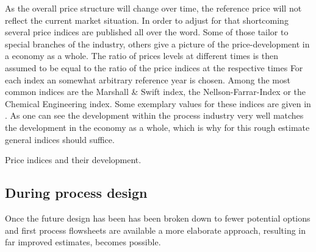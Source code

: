         As the overall price structure will change over time, the reference price will not reflect the current
        market situation. In order to adjust for that shortcoming several price indices are published
        all over the word. Some of those tailor to special branches of the industry, others give a picture
        of the price-development in a economy as a whole. The ratio of prices levels at different times
        is then assumed to be equal to the ratio of the price indices at the respective times
        For each index an somewhat arbitrary reference year is chosen. Among the most common indices are the
        Marshall \& Swift index, the Nellson-Farrar-Index or the Chemical Engineering index. Some exemplary
        values for these indices are given in . As one can see the development within the
        process industry very well matches the development in the economy as a whole, which is why for this rough
        estimate general indices should suffice.

        \begin{table}
        	\center
        	
        	\caption{Price indices and their development.}
        	\label{tab:PriceIndices}
        \end{table}

    \subsection{During process design}
        Once the future design has been has been broken down to fewer potential options and first process
        flowsheets are available a more elaborate approach, resulting in far improved estimates, becomes possible.

